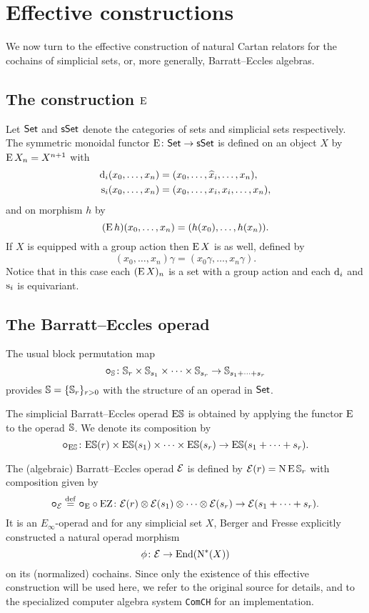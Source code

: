
\section{Effective constructions}\label{s:effective}

We now turn to the effective construction of natural Cartan relators for the cochains of simplicial sets, or, more generally, Barratt--Eccles algebras.

\subsection{The construction $\operatorname{E}$}

Let $\mathsf{Set}$ and $\mathsf{sSet}$ denote the categories of sets and simplicial sets respectively.
The symmetric monoidal functor $\operatorname{E} \colon \mathsf{Set} \to \mathsf{sSet}$ is defined on an object $X$ by $\operatorname{E} X_n = X^{n+1}$ with
\[
\begin{split}
	\operatorname{d}_i(x_0,\dots,x_n) &= (x_0,\dots,\widehat{x}_i,\dots,x_n), \\
	\operatorname{s}_i(x_0,\dots,x_n) &= (x_0, \dots, x_i, x_i, \dots, x_n),
\end{split}
\]
and on morphism $h$ by
\[
(\operatorname{E} h)(x_0,\dots,x_n) = (h(x_0),\dots,h(x_n)).
\]
If $X$ is equipped with a group action then $\operatorname{E} X$ is as well, defined by
\[
(x_0,\dots,x_n) \gamma = (x_0 \gamma, \dots, x_n \gamma).
\]
Notice that in this case each $(\operatorname{E} X)_n$ is a set with a group action and each $\operatorname{d}_i$ and $\operatorname{s}_i$ is equivariant.

\subsection{The Barratt--Eccles operad}

The usual block permutation map
\[
\bm{\circ}_{\mathbb{S}} \colon \mathbb{S}_r \times \mathbb{S}_{s_1} \times \cdots \times \mathbb{S}_{s_r} \to \mathbb{S}_{s_1+\dots+s_r}
\]
provides $\mathbb{S} = \{\mathbb{S}_r\}_{r>0}$ with the structure of an operad in $\mathsf{Set}$.

The simplicial Barratt--Eccles operad $\mathrm{E}\mathbb{S}$ is obtained by applying the functor $\operatorname{E}$ to the operad $\mathbb{S}$.
We denote its composition by
\[
\bm{\circ}_{\mathrm{E}\mathbb{S}} \colon
\mathrm{E}\mathbb{S}(r) \times \mathrm{E}\mathbb{S}(s_1) \times\dots\times \mathrm{E}\mathbb{S}(s_r) \to
\mathrm{E}\mathbb{S}(s_1+\dots+s_r).
\]

The (algebraic) Barratt--Eccles operad $\mathcal{E}$ is defined by $\mathcal{E}(r) = \operatorname{N}\operatorname{E}\mathbb{S}_r$ with composition given by
\[
\bm{\circ}_{\mathcal{E}} \stackrel{\mathrm{def}}{=} \bm{\circ}_{\operatorname{E}} \mathbin{\circ} \operatorname{EZ} \colon \mathcal{E}(r) \otimes \mathcal{E}(s_1) \otimes\dotsb\otimes \mathcal{E}(s_r) \to \mathcal{E}(s_1+\dots+s_r).
\]
It is an $E_\infty$-operad and for any simplicial set $X$, Berger and Fresse \cite{berger2004combinatorial} explicitly constructed a natural operad morphism
\[
\phi \colon \mathcal{E} \to \mathrm{End}(\operatorname{N^{\ast}}(X))
\]
on its (normalized) cochains.
Since only the existence of this effective construction will be used here, we refer to the original source for details, and to the specialized computer algebra system \texttt{ComCH} for an implementation.

